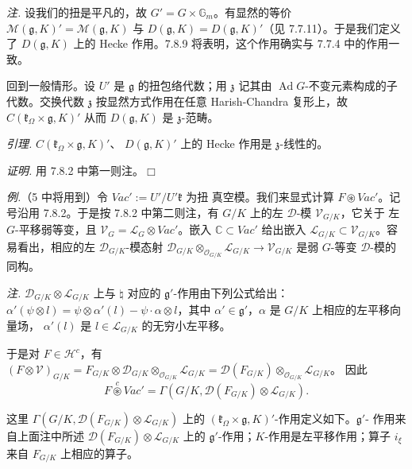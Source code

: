  \emph{注.} 设我们的扭是平凡的，故
$G'=G\times\mathbb{G}_m$。有显然的等价
$\mathcal{M}(\mathfrak{g},K)'=\mathcal{M}(\mathfrak{g},K)$ 与
$D(\mathfrak{g},K)=D(\mathfrak{g},K)'$（见 7.7.11）。于是我们定义了
$D(\mathfrak{g},K)$ 上的 Hecke 作用。7.8.9 将表明，这个作用确实与
7.7.4 中的作用一致。

回到一般情形。设 $U'$ 是 $\mathfrak{g}$ 的扭包络代数；用 $\mathfrak{z}$
记其由 $\operatorname{Ad}G$-不变元素构成的子代数。交换代数 $\mathfrak{z}$
按显然方式作用在任意 Harish-Chandra 复形上，故
$C(\mathfrak{k}_\Omega\times\mathfrak{g},K)'$ 从而 $D(\mathfrak{g},K)$
是 $\mathfrak{z}$-范畴。


 \emph{引理.} $C(\mathfrak{k}_\Omega\times\mathfrak{g},K)'$、
$D(\mathfrak{g},K)'$ 上的 Hecke 作用是 $\mathfrak{z}$-线性的。

\emph{证明.} 用 7.8.2 中第一则注。\hfill$\Box$

 \emph{例.}（5 中将用到）令 $Vac':=U'/U'\mathfrak{k}$ 为扭
真空模。我们来显式计算 $F\circledast Vac'$。记号沿用 7.8.2。于是按 7.8.2
中第二则注，有 $G/K$ 上的左 $\mathcal{D}$-模 $\mathcal{V}_{G/K}$，它关于
左 $G$-平移弱等变，且 $\mathcal{V}_G=\mathcal{L}_G\otimes Vac'$。嵌入
$\mathbb{C}\subset Vac'$ 给出嵌入
$\mathcal{L}_{G/K}\subset\mathcal{V}_{G/K}$。容易看出，相应的左
$\mathcal{D}_{G/K}$-模态射 $\mathcal{D}_{G/K}
\otimes_{\mathcal{O}_{G/K}}\mathcal{L}_{G/K}\to\mathcal{V}_{G/K}$
是弱 $G$-等变 $\mathcal{D}$-模的同构。

\emph{注.} $\mathcal{D}_{G/K}\otimes\mathcal{L}_{G/K}$ 上与 $\natural$
对应的 $\mathfrak{g}'$-作用由下列公式给出：$\alpha'(\psi\otimes l)
=\psi\otimes\alpha'(l)-\psi\cdot\alpha\otimes l$，其中
$\alpha'\in\mathfrak{g}'$，$\alpha$ 是 $G/K$ 上相应的左平移向量场，
$\alpha'(l)$ 是 $l\in\mathcal{L}_{G/K}$ 的无穷小左平移。

于是对 $F\in\mathcal{H}^c$，有
$(F\otimes\mathcal{V})_{G/K}=F_{G/K}\otimes\mathcal{D}_{G/K}
\otimes_{\mathcal{O}_{G/K}}\mathcal{L}_{G/K}
=\mathcal{D}(F_{G/K})\otimes_{\mathcal{O}_{G/K}}\mathcal{L}_{G/K}$。
因此
\begin{equation}\tag{333}
F\overset{c}{\circledast}Vac'
=\Gamma(G/K,\mathcal{D}(F_{G/K})\otimes\mathcal{L}_{G/K}).
\end{equation}

这里 $\Gamma(G/K,\mathcal{D}(F_{G/K})\otimes\mathcal{L}_{G/K})$ 上的
$(\mathfrak{k}_\Omega\times\mathfrak{g},K)'$-作用定义如下。$\mathfrak{g}'$-
作用来自上面注中所述 $\mathcal{D}(F_{G/K})\otimes\mathcal{L}_{G/K}$ 上的
$\mathfrak{g}'$-作用；$K$-作用是左平移作用；算子 $i_\xi$ 来自
$F_{G/K}$ 上相应的算子。

